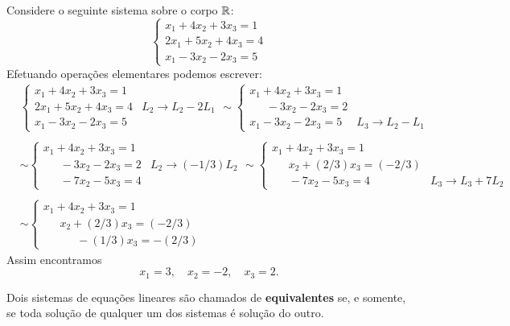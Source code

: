 \begin{exemplo}
	Considere o seguinte sistema sobre o corpo $\mathbb{R}$:
	\[
		\begin{cases}
			x_1 + 4x_2 + 3x_3 = 1\\
			2x_1 + 5x_2 + 4x_3 = 4\\
			x_1 - 3x_2 - 2x_3 = 5
		\end{cases}
	\]
	Efetuando opera\c{c}\~oes elementares podemos escrever:
	\begin{align*}
		&\begin{cases}
			x_1 + 4x_2 + 3x_3 = 1\\
			2x_1 + 5x_2 + 4x_3 = 4 & L_2 \rightarrow L_2 - 2L_1\\
			x_1 - 3x_2 - 2x_3 = 5
		\end{cases} \sim
		\begin{cases}
			x_1 + 4x_2 + 3x_3 = 1\\
			\phantom{0x_1} -3x_2 - 2x_3 = 2\\
			x_1 - 3x_2 - 2x_3 = 5 & L_3 \rightarrow L_2 - L_1
		\end{cases}\\ \\ & \sim
		\begin{cases}
			x_1 + 4x_2 + 3x_3 = 1\\
			\phantom{0x_1} - 3x_2 - 2x_3 = 2 & L_2 \rightarrow (-1/3)L_2\\
			\phantom{0x_1} - 7x_2 - 5x_3 = 4
		\end{cases} \sim
		\begin{cases}
			x_1 + 4x_2 + 3x_3 = 1\\
			\phantom{0x_1} x_2 + (2/3)x_3 = (-2/3)\\
			\phantom{0x_1} - 7x_2 - 5x_3 = 4 & L_3 \rightarrow L_3 + 7L_2
		\end{cases}\\ \\ & \sim
		\begin{cases}
			x_1 + 4x_2 + 3x_3 = 1\\
			\phantom{0x_1} x_2 + (2/3)x_3 = (-2/3)\\
			\phantom{0x_1} \phantom{0x_2}  -(1/3)x_3 = -(2/3)
		\end{cases}
	\end{align*}
	Assim encontramos
	\[
		x_1 = 3, \quad x_2 = -2, \quad x_3 = 2.
	\]
\end{exemplo}

\begin{definicao}
	Dois sistemas de equa\c{c}\~oes lineares s\~ao chamados de \textbf{equivalentes} se, e somente, se toda solu\c{c}\~ao de qualquer um dos sistemas \'e solu\c{c}\~ao do outro.
\end{definicao}

